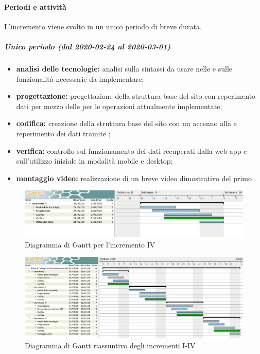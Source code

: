 			\paragraph{Periodi e attività}
			
				L'incremento viene svolto in un unico periodo di breve durata.
				
				\subparagraph{Unico periodo (dal 2020-02-24 al 2020-03-01)}
				
					\begin{itemize}
						\item \textbf{analisi delle tecnologie:} analisi sulla sintassi da usare nelle  e sulle funzionalità necessarie da implementare;	
						\item \textbf{progettazione:} progettazione della struttura base del sito con reperimento dati per mezzo delle  per le operazioni attualmente implementate;
						\item \textbf{codifica:} creazione della struttura base del sito con un accenno alla  e reperimento dei dati tramite ;
						\item \textbf{verifica:} controllo sul funzionamento dei dati recuperati dalla web app e sull'utilizzo iniziale in modalità mobile e desktop;
						\item \textbf{montaggio video:} realizzazione di un breve video dimostrativo del primo .
					\end{itemize} 			

		\begin{landscape}
          \begin{figure}[H]
            \centering
            \includegraphics[width=\linewidth]{images/gantt/incrementoIV} %
            \caption{Diagramma di Gantt per l'incremento IV}
          \end{figure}		
		\end{landscape}
	
		
		\begin{landscape}
			\begin{figure}[H]
				\centering
				\includegraphics[width=\linewidth]{images/gantt/incrementi-I-IV} %
				\caption{Diagramma di Gantt riassuntivo degli incrementi I-IV}
			\end{figure}		
		\end{landscape}

